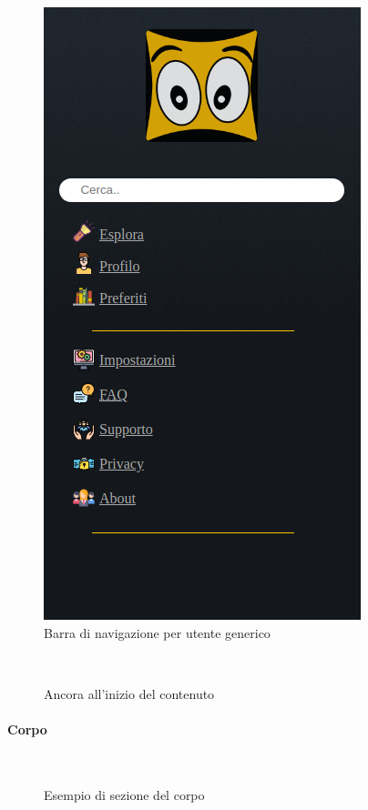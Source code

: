 \begin{figure}[h!]  				%
	\centerline{\includegraphics[scale=0.45]{img/nav_bar.png}}
	\caption{Barra di navigazione per utente generico}
	\label{fig:navbarGU}
\end{figure}
~\\

\begin{figure}[h!]
	\caption{Ancora all'inizio del contenuto}
\end{figure}
\paragraph{Corpo}
~\\

\begin{figure}[h!]
	\caption{Esempio di sezione del corpo}
	\label{fig:corpoGU}
\end{figure}
